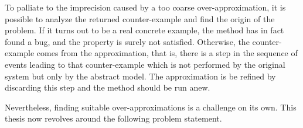 To palliate to the imprecision caused by a too coarse
over-approximation, it is possible to analyze the returned
counter-example and find the origin of the problem. If it turns out to
be a real concrete example, the method has in fact found a bug, and
the property is surely not satisfied. Otherwise, the counter-example
comes from the approximation, that is, there is a step in the sequence
of events leading to that counter-example which is not performed by
the original system but only by the abstract model. The approximation
is be refined by discarding this step and the method should be run
anew.

Nevertheless, finding suitable over-approximations is a challenge on
its own. %
This thesis now revolves around the following problem statement.

